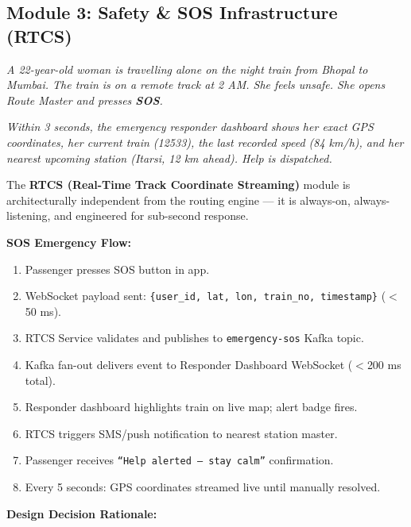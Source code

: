 \documentclass[12pt,a4paper]{report}
\begin{document}
\subsection{Module 3: Safety \& SOS Infrastructure (RTCS)}

\begin{tcolorbox}[storybox]
\textit{A 22-year-old woman is travelling alone on the night train from Bhopal to Mumbai. The train is on a remote track at 2 AM. She feels unsafe. She opens Route Master and presses \textbf{SOS}.}

\textit{Within 3 seconds, the emergency responder dashboard shows her exact GPS coordinates, her current train (12533), the last recorded speed (84 km/h), and her nearest upcoming station (Itarsi, 12 km ahead). Help is dispatched.}
\end{tcolorbox}

The \textbf{RTCS (Real-Time Track Coordinate Streaming)} module is architecturally independent from the routing engine --- it is always-on, always-listening, and engineered for sub-second response.

\textbf{SOS Emergency Flow:}

\begin{enumerate}[leftmargin=1.5em]
  \item Passenger presses SOS button in app.
  \item WebSocket payload sent: \texttt{\{user\_id, lat, lon, train\_no, timestamp\}} ($<$50 ms).
  \item RTCS Service validates and publishes to \texttt{emergency-sos} Kafka topic.
  \item Kafka fan-out delivers event to Responder Dashboard WebSocket ($<$200 ms total).
  \item Responder dashboard highlights train on live map; alert badge fires.
  \item RTCS triggers SMS/push notification to nearest station master.
  \item Passenger receives \texttt{``Help alerted --- stay calm''} confirmation.
  \item Every 5 seconds: GPS coordinates streamed live until manually resolved.
\end{enumerate}

\textbf{Design Decision Rationale:}
\end{document}
